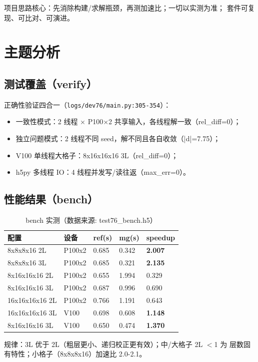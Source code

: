 \documentclass[UTF8]{ctexart}
\begin{document}
\begin{ideabox}
项目思路核心：先消除构建/求解瓶颈，再测加速比；一切以实测为准；
套件可复现、可比对、可演进。
\end{ideabox}

\section{主题分析}
\subsection{测试覆盖（verify）}
正确性验证四合一（\texttt{logs/dev76/main.py:305-354}）：
\begin{itemize}
\item 一致性模式：2 线程 × P100×2 共享输入，各线程解一致（rel\_diff=0）；
\item 独立问题模式：2 线程不同 seed，解不同且各自收敛（|d|=7.75）；
\item V100 单线程大格子：8x16x16x16 3L（rel\_diff=0）；
\item h5py 多线程 IO：4 线程并发写/读往返（max\_err=0）。
\end{itemize}

\subsection{性能结果（bench）}
\begin{table}[htbp]\centering
\begin{tabular}{lllll}
\toprule
配置 & 设备 & ref(s) & mg(s) & speedup \\
\midrule
8x8x8x16 2L & P100x2 & 0.685 & 0.342 & \textbf{2.007} \\
8x8x8x16 3L & P100x2 & 0.685 & 0.321 & \textbf{2.135} \\
8x16x16x16 2L & P100x2 & 0.655 & 1.994 & 0.329 \\
8x16x16x16 3L & P100x2 & 0.687 & 0.996 & 0.690 \\
16x16x16x16 2L & P100x2 & 0.766 & 1.191 & 0.643 \\
16x16x16x16 3L & V100 & 0.698 & 0.608 & \textbf{1.148} \\
8x16x16x16 3L & V100 & 0.650 & 0.474 & \textbf{1.370} \\
\bottomrule
\end{tabular}
\caption{bench 实测（数据来源: test76\_bench.h5）}
\end{table}

规律：3L 优于 2L（粗层更小、递归校正更有效）；中/大格子 2L $<$1 为
层数固有特性；小格子（8x8x8x16）加速比 2.0-2.1。
\end{document}
